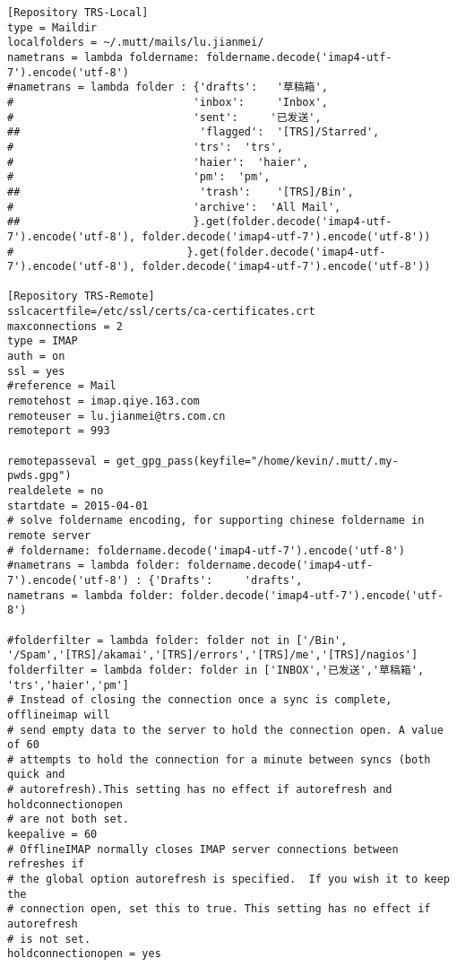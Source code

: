 \documentclass[10pt,a4paper]{article}
\begin{document}
\begin{enumerate}
\begin{lstlisting}
[Repository TRS-Local]
type = Maildir
localfolders = ~/.mutt/mails/lu.jianmei/
nametrans = lambda foldername: foldername.decode('imap4-utf-7').encode('utf-8')
#nametrans = lambda folder : {'drafts':   '草稿箱',
#                            'inbox':     'Inbox',
#                            'sent':     '已发送',
##                            'flagged':  '[TRS]/Starred',
#                            'trs':  'trs',
#                            'haier':  'haier',
#                            'pm':  'pm',
##                            'trash':    '[TRS]/Bin',
#                            'archive':  'All Mail',
##                           }.get(folder.decode('imap4-utf-7').encode('utf-8'), folder.decode('imap4-utf-7').encode('utf-8'))
#                           }.get(folder.decode('imap4-utf-7').encode('utf-8'), folder.decode('imap4-utf-7').encode('utf-8'))

[Repository TRS-Remote]
sslcacertfile=/etc/ssl/certs/ca-certificates.crt
maxconnections = 2
type = IMAP
auth = on
ssl = yes
#reference = Mail
remotehost = imap.qiye.163.com
remoteuser = lu.jianmei@trs.com.cn
remoteport = 993

remotepasseval = get_gpg_pass(keyfile="/home/kevin/.mutt/.my-pwds.gpg")
realdelete = no
startdate = 2015-04-01
# solve foldername encoding, for supporting chinese foldername in remote server
# foldername: foldername.decode('imap4-utf-7').encode('utf-8')
#nametrans = lambda folder: foldername.decode('imap4-utf-7').encode('utf-8') : {'Drafts':     'drafts',
nametrans = lambda folder: folder.decode('imap4-utf-7').encode('utf-8')

#folderfilter = lambda folder: folder not in ['/Bin', '/Spam','[TRS]/akamai','[TRS]/errors','[TRS]/me','[TRS]/nagios']
folderfilter = lambda folder: folder in ['INBOX','已发送','草稿箱', 'trs','haier','pm']
# Instead of closing the connection once a sync is complete, offlineimap will
# send empty data to the server to hold the connection open. A value of 60
# attempts to hold the connection for a minute between syncs (both quick and
# autorefresh).This setting has no effect if autorefresh and holdconnectionopen
# are not both set.
keepalive = 60
# OfflineIMAP normally closes IMAP server connections between refreshes if
# the global option autorefresh is specified.  If you wish it to keep the
# connection open, set this to true. This setting has no effect if autorefresh
# is not set.
holdconnectionopen = yes
\end{lstlisting}


\end{enumerate}
\end{document}
